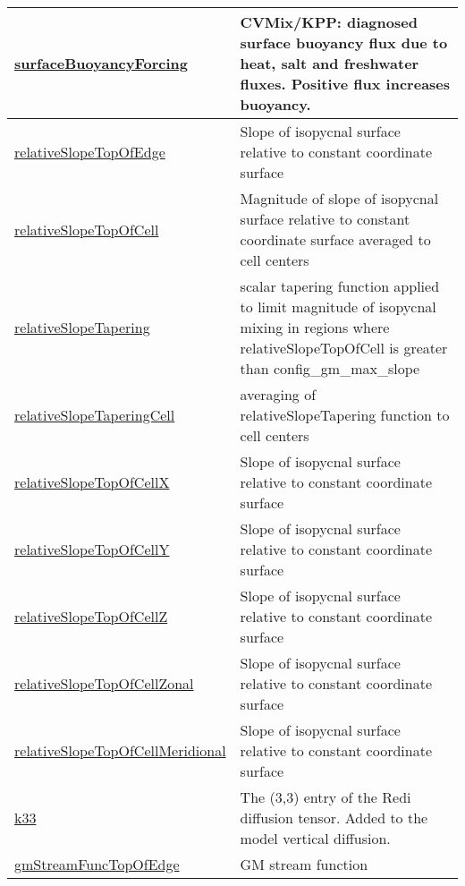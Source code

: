 {\begin{center}
\begin{longtable}{| p{2.0in} | p{4.0in} |}
    \hline
    \hyperref[subsec:var_sec_diagnostics_surfaceBuoyancyForcing]{surfaceBuoyancyForcing} & CVMix/KPP: diagnosed surface buoyancy flux due to heat, salt and freshwater fluxes. Positive flux increases buoyancy. \\
    \hline
    \hyperref[subsec:var_sec_diagnostics_relativeSlopeTopOfEdge]{relativeSlopeTopOfEdge} & Slope of isopycnal surface relative to constant coordinate surface \\
    \hline
    \hyperref[subsec:var_sec_diagnostics_relativeSlopeTopOfCell]{relativeSlopeTopOfCell} & Magnitude of slope of isopycnal surface relative to constant coordinate surface averaged to cell centers \\
    \hline
    \hyperref[subsec:var_sec_diagnostics_relativeSlopeTapering]{relativeSlopeTapering} & scalar tapering function applied to limit magnitude of isopycnal mixing in regions where relativeSlopeTopOfCell is greater than config\_gm\_max\_slope \\
    \hline
    \hyperref[subsec:var_sec_diagnostics_relativeSlopeTaperingCell]{relativeSlopeTaperingCell} & averaging of relativeSlopeTapering function to cell centers \\
    \hline
    \hyperref[subsec:var_sec_diagnostics_relativeSlopeTopOfCellX]{relativeSlopeTopOfCellX} & Slope of isopycnal surface relative to constant coordinate surface \\
    \hline
    \hyperref[subsec:var_sec_diagnostics_relativeSlopeTopOfCellY]{relativeSlopeTopOfCellY} & Slope of isopycnal surface relative to constant coordinate surface \\
    \hline
    \hyperref[subsec:var_sec_diagnostics_relativeSlopeTopOfCellZ]{relativeSlopeTopOfCellZ} & Slope of isopycnal surface relative to constant coordinate surface \\
    \hline
    \hyperref[subsec:var_sec_diagnostics_relativeSlopeTopOfCellZonal]{relativeSlopeTopOfCellZonal} & Slope of isopycnal surface relative to constant coordinate surface \\
    \hline
    \hyperref[subsec:var_sec_diagnostics_relativeSlopeTopOfCellMeridional]{relativeSlopeTopOfCellMeridional} & Slope of isopycnal surface relative to constant coordinate surface \\
    \hline
    \hyperref[subsec:var_sec_diagnostics_k33]{k33} & The (3,3) entry of the Redi diffusion tensor. Added to the model vertical diffusion. \\
    \hline
    \hyperref[subsec:var_sec_diagnostics_gmStreamFuncTopOfEdge]{gmStreamFuncTopOfEdge} & GM stream function \\

\end{longtable}
\end{center}}
